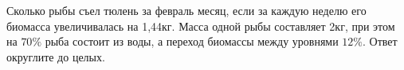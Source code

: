 
Сколько рыбы съел тюлень за февраль месяц, если за каждую неделю его
биомасса увеличивалась на 1,44кг.  Масса
одной рыбы составляет 2кг, при этом на $70\%$ рыба состоит из воды, а переход
биомассы между уровнями $12\%$. Ответ округлите до целых.

\explanationSection


